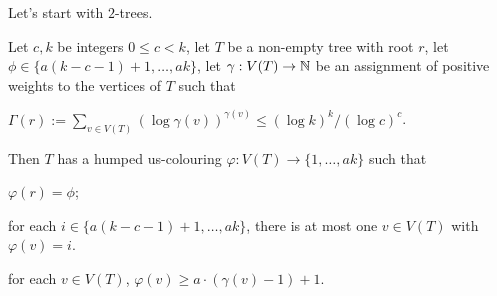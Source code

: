 \documentclass[kpfonts]{patmorin}
\begin{document}
Let's start with $2$-trees.

\begin{lem}
Let $c,k$ be integers $0\le c< k$, let $T$ be a non-empty tree with root $r$, let $\phi\in\{a(k-c-1)+1,\ldots,ak\}$, let $\gamma:V(T)\to\mathbb{N}$ be an assignment of positive weights to the vertices of $T$ such that
\begin{compactenum}[(R1)]
    \item $\Gamma(r):=\sum_{v\in V(T)} (\log \gamma(v))^{\gamma(v)} \le (\log k)^k/(\log c)^c$. \label{total-weight}
\end{compactenum}
Then $T$ has a humped us-colouring $\varphi:V(T)\to\{1,\ldots,ak\}$ such that
\begin{compactenum}[(P1)]
    \item $\varphi(r)=\phi$;
    \item for each $i\in\{a(k-c-1)+1,\ldots,ak\}$, there is at most one $v\in V(T)$ with $\varphi(v)=i$.
    \item for each $v\in V(T)$, $\varphi(v)\ge a\cdot(\gamma(v)-1)+1$.
\end{compactenum}
\end{lem}
\end{document}
